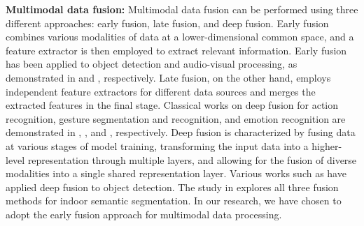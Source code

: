 \documentclass[]{modified_llncs}
\begin{document}
\textbf{Multimodal data fusion:}
Multimodal data fusion can be performed using three different approaches: early fusion, late fusion, and deep fusion. Early fusion combines various modalities of data at a lower-dimensional common space, and a feature extractor is then employed to extract relevant information. Early fusion has been applied to object detection and audio-visual processing, as demonstrated in \cite{early1} and \cite{early2}, respectively. Late fusion, on the other hand, employs independent feature extractors for different data sources and merges the extracted features in the final stage. Classical works on deep fusion for action recognition, gesture segmentation and recognition, and emotion recognition are demonstrated in \cite{late1}, \cite{late2}, and \cite{late3}, respectively. Deep fusion is characterized by fusing data at various stages of model training, transforming the input data into a higher-level representation through multiple layers, and allowing for the fusion of diverse modalities into a single shared representation layer. Various works such as \cite{zongwei1,zongwei2,zongwei3,deep1,deep2,DBLP:journals/corr/ChenMWLX16} have applied deep fusion to object detection. The study in \cite{early_late_deep} explores all three fusion methods for indoor semantic segmentation. In our research, we have chosen to adopt the early fusion approach for multimodal data processing.\\
\end{document}
